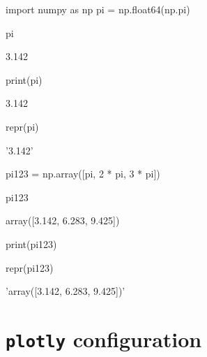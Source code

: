 \documentclass[oneside]{book}
\begin{document}
\begin{pycell}
import numpy as np
pi = np.float64(np.pi)
\end{pycell}

\begin{pycell}
pi
\end{pycell}

\begin{pyexpectedoutput}
3.142
\end{pyexpectedoutput}

\begin{pycell}
print(pi)
\end{pycell}

\begin{pyexpectedoutput}
3.142
\end{pyexpectedoutput}

\begin{pycell}
repr(pi)
\end{pycell}

\begin{pyexpectedoutput}
'3.142'
\end{pyexpectedoutput}

\begin{pycell}
pi123 = np.array([pi, 2 * pi, 3 * pi])
\end{pycell}

\begin{pycell}
pi123
\end{pycell}

\begin{pyexpectedoutput}
array([3.142, 6.283, 9.425])
\end{pyexpectedoutput}

\begin{pycell}
print(pi123)
\end{pycell}

\begin{pyexpectedoutput}
[3.142 6.283 9.425]
\end{pyexpectedoutput}

\begin{pycell}
repr(pi123)
\end{pycell}

\begin{pyexpectedoutput}
'array([3.142, 6.283, 9.425])'
\end{pyexpectedoutput}

\section{\texttt{plotly} configuration}
\end{document}
